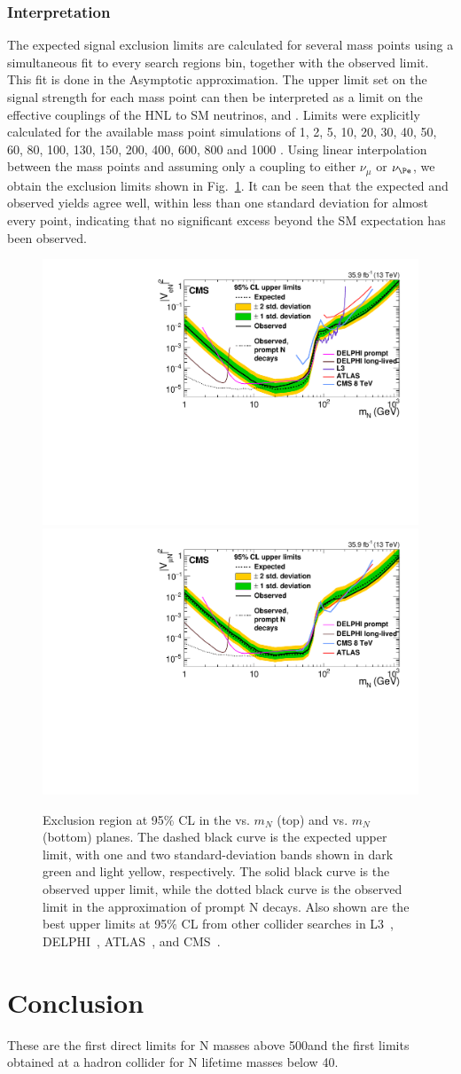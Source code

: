 \subsubsection{Interpretation}
 The expected signal exclusion limits are calculated for
 several mass points using a simultaneous fit to every search regions
 bin, together with the observed limit. This fit is done in the
 Asymptotic approximation. The upper limit set on the signal strength
 for each mass point can then be interpreted as a
 limit on the effective couplings of the HNL to SM neutrinos, \mixpare
 and \mixparm. Limits were explicitly calculated for the available
 mass point simulations of 1, 2, 5, 10, 20, 30, 40, 50, 60, 80, 100,
 130, 150, 200, 400, 600, 800 and 1000 \GeV. Using linear
 interpolation between the mass points and assuming only a coupling to either $\nu_{\mu}$ or $\nu_{\Pe}$,
 we obtain the exclusion limits shown in Fig.~\ref{fig:limits}. It can be seen that the expected and
 observed yields agree well, within less than one standard deviation
 for almost every point, indicating that no significant excess beyond
 the SM expectation has been observed. 
\begin{figure}[h]
\centering
\includegraphics[width=.65\textwidth]{Figures/c5/limits/CMS-EXO-17-012_Figure_002-a.pdf}\\
\includegraphics[width=.65\textwidth]{Figures/c5/limits/CMS-EXO-17-012_Figure_002-b.pdf}
\caption{Exclusion region at 95$\%$ CL in the \mixpare vs. $m_N$ (top) and \mixparm vs. $m_N$ (bottom) planes.
The dashed black curve is the expected upper limit, with one and two standard-deviation
bands shown in dark green and light yellow, respectively. The solid black curve is the observed
upper limit, while the dotted black curve is the observed limit in the approximation of
prompt N decays. Also shown are the best upper limits at 95$\%$ CL from other collider searches
in L3~\cite{ACHARD200167}, DELPHI~\cite{Abreu:1996pa}, ATLAS~\cite{Aad_2015}, and CMS~\cite{Sirunyan:2018xiv}.}
\label{fig:limits}
\end{figure}

\section{Conclusion}
These are the first direct limits for N
masses above 500\GeV and the first
limits obtained at a hadron collider for N
lifetime masses below 40\GeV.
